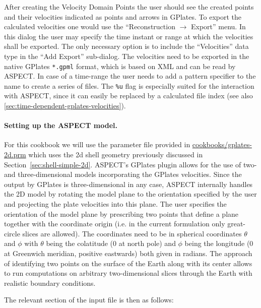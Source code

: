 \documentclass{article}
\newcommand{\aspect}{\textsc{ASPECT}}
\begin{document}
After creating the Velocity Domain Points the user should see the
created points and their velocities indicated as points and arrows in GPlates.
To export the calculated velocities one would use the ``Reconstruction
$\rightarrow$ Export'' menu. In this dialog the user may specify the time
instant or range at which the velocities shall be exported. The only necessary option is
to include the ``Velocities'' data type in the ``Add Export'' sub-dialog. The
velocities need to be exported in the native GPlates \texttt{*.gpml} format,
which is based on XML and can be read by \aspect{}. In case of a time-range the
user needs to add a pattern specifier to the name to create a series of files.
The \texttt{\%u} flag is especially suited for the interaction with \aspect{},
since it can easily be
replaced by a calculated file index (see also
\ref{sec:time-dependent-gplates-velocities}).

\paragraph{Setting up the \aspect{} model.}

For this cookbook we will use the parameter file provided in
\url{cookbooks/gplates-2d.prm} which uses the 2d shell geometry previously
discussed in Section~\ref{sec:shell-simple-2d}. \aspect{}'s GPlates plugin
allows for the use of two- and three-dimensional models incorporating the
GPlates velocities. Since the output by GPlates is three-dimensional in any case,
\aspect{} internally handles the 2D model by rotating the model plane to the
orientation specified by the user and projecting the plate velocities into this plane. The
user specifies the orientation of the model plane by prescribing two points that
define a plane together with the coordinate origin (i.e. in the current
formulation only great-circle slices are allowed). The coordinates need to be in
spherical coordinates $\theta$ and $\phi$ with $\theta$ being the colatitude (0
at north pole) and $\phi$ being the longitude (0 at Greenwich meridian, positive
eastwards) both given in radians.
The approach of identifying two points on the surface of the Earth along with
its center allows to run computations on arbitrary two-dimensional slices
through the Earth with realistic boundary conditions.

The relevant section of the input file is then as follows:


\end{document}
